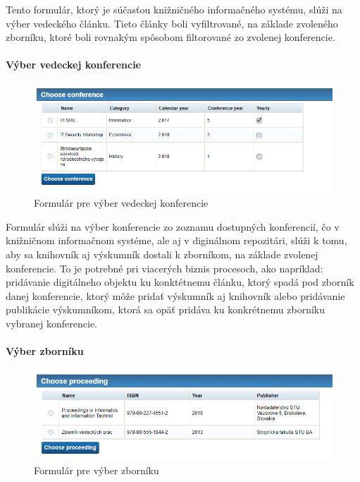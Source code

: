 \documentclass[10pt,oneside,slovak,a4paper]{article}
\begin{document}
Tento formulár, ktorý je súčasťou knižničného informačného systému, slúži na výber vedeckého článku. Tieto články boli vyfiltrované, na základe zvoleného zborníku, ktoré boli rovnakým spôsobom filtorované zo zvolenej konferencie.

\paragraph{Výber vedeckej konferencie}

\begin{figure} [H]
\centering
\includegraphics[scale=0.4]{forms/Coachchooseconference.png} 
\caption{Formulár pre výber vedeckej konferencie}
\end{figure}

Formulár slúži na výber konferencie zo zoznamu dostupných konferencií, čo v knižničnom informačnom systéme, ale aj v diginálnom repozitári, slúži k tomu, aby sa knihovník aj výskumník dostali k zborníkom, na základe zvolenej konferencie. To je potrebné pri viacerých biznis procesoch, ako napríklad: pridávanie digitálneho objektu ku konktétnemu článku, ktorý spadá pod zborník danej konferencie, ktorý môže pridať výskumník aj knihovník alebo pridávanie publikácie výskumníkom, ktorá sa opäť pridáva ku konkrétnemu zborníku vybranej konferencie.

\paragraph{Výber zborníku}

\begin{figure} [H]
\centering
\includegraphics[scale=0.4]{forms/Choachchooseproceeding.png} 
\caption{Formulár pre výber zborníku}
\end{figure}
\end{document}

